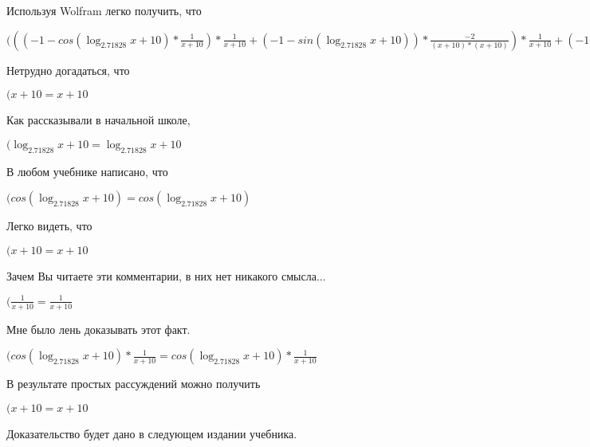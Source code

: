 \documentclass[12pt,a4paper,fleqn]{article}
\theoremstyle{definition}
\begin{document}
Используя Wolfram легко получить, что

$((( -1  - cos(\log_{ 2.71828 }{ x  +  10 }) * \frac{ 1 }{ x  +  10 }
) * \frac{ 1 }{ x  +  10 }
 + ( -1  - sin(\log_{ 2.71828 }{ x  +  10 })) * \frac{ -2 }{( x  +  10 ) * ( x  +  10 )}
) * \frac{ 1 }{ x  +  10 }
 + ( -1  - sin(\log_{ 2.71828 }{ x  +  10 })) * \frac{ 1 }{ x  +  10 }
 * \frac{ -2 }{( x  +  10 ) * ( x  +  10 )}
 + ( -1  - sin(\log_{ 2.71828 }{ x  +  10 })) * \frac{ 1 }{ x  +  10 }
 * \frac{ -2 }{( x  +  10 ) * ( x  +  10 )}
 + cos(\log_{ 2.71828 }{ x  +  10 }) * \frac{ -1  -  -2  * ( x  +  10  +  x  +  10 )}{( x  +  10 ) * ( x  +  10 ) * ( x  +  10 ) * ( x  +  10 )}
 = (( -1  - cos(\log_{ 2.71828 }{ x  +  10 }) * \frac{ 1 }{ x  +  10 }
) * \frac{ 1 }{ x  +  10 }
 + ( -1  - sin(\log_{ 2.71828 }{ x  +  10 })) * \frac{ -2 }{( x  +  10 ) * ( x  +  10 )}
) * \frac{ 1 }{ x  +  10 }
 + ( -1  - sin(\log_{ 2.71828 }{ x  +  10 })) * \frac{ 1 }{ x  +  10 }
 * \frac{ -2 }{( x  +  10 ) * ( x  +  10 )}
 + ( -1  - sin(\log_{ 2.71828 }{ x  +  10 })) * \frac{ 1 }{ x  +  10 }
 * \frac{ -2 }{( x  +  10 ) * ( x  +  10 )}
 + cos(\log_{ 2.71828 }{ x  +  10 }) * \frac{ -1  -  -2  * ( x  +  10  +  x  +  10 )}{( x  +  10 ) * ( x  +  10 ) * ( x  +  10 ) * ( x  +  10 )}
$

Нетрудно догадаться, что

$( x  +  10  =  x  +  10 $

Как рассказывали в начальной школе,

$(\log_{ 2.71828 }{ x  +  10 } = \log_{ 2.71828 }{ x  +  10 }$

В любом учебнике написано, что

$(cos(\log_{ 2.71828 }{ x  +  10 }) = cos(\log_{ 2.71828 }{ x  +  10 })$

Легко видеть, что

$( x  +  10  =  x  +  10 $

Зачем Вы читаете эти комментарии, в них нет никакого смысла...

$(\frac{ 1 }{ x  +  10 }
 = \frac{ 1 }{ x  +  10 }
$

Мне было лень доказывать этот факт.

$(cos(\log_{ 2.71828 }{ x  +  10 }) * \frac{ 1 }{ x  +  10 }
 = cos(\log_{ 2.71828 }{ x  +  10 }) * \frac{ 1 }{ x  +  10 }
$

В результате простых рассуждений можно получить

$( x  +  10  =  x  +  10 $

Доказательство будет дано в следующем издании учебника.
\end{document}
